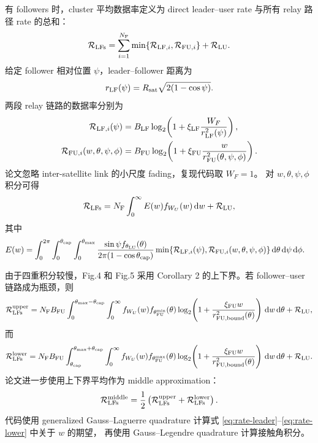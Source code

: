 \documentclass[UTF8,a4paper,11pt]{ctexart}
\newcommand{\Rsat}{R_{\rm sat}}
\newcommand{\thetac}{\theta_{\rm cap}}
\newcommand{\thetam}{\theta_{\max}}
\newcommand{\NF}{N_{\rm F}}
\newcommand{\dd}{\,{\rm d}}
\newcommand{\rFU}{r_{\rm FU}}
\newcommand{\rLF}{r_{\rm LF}}
\newcommand{\RLFs}{\mathcal{R}_{\rm LFs}}
\newcommand{\RLU}{\mathcal{R}_{\rm LU}}
\begin{document}
有 followers 时，cluster 平均数据率定义为 direct leader--user rate 与所有 relay
路径 rate 的总和：
\begin{equation}
    \RLFs=
    \sum_{i=1}^{\NF}\min\{\mathcal{R}_{{\rm LF},i},\mathcal{R}_{{\rm FU},i}\}+\RLU .
    \label{eq:rate-cluster-def}
\end{equation}
给定 follower 相对位置 $\psi$，leader--follower 距离为
\begin{equation}
    \rLF(\psi)=\Rsat\sqrt{2(1-\cos\psi)}.
\end{equation}
两段 relay 链路的数据率分别为
\begin{align}
    \mathcal{R}_{{\rm LF},i}(\psi)
    &=
    B_{\rm LF}\log_2\!\left(1+\xi_{\rm LF}\frac{W_F}{\rLF^2(\psi)}\right),\\
    \mathcal{R}_{{\rm FU},i}(w,\theta,\psi,\phi)
    &=
    B_{\rm FU}\log_2\!\left(1+\xi_{\rm FU}\frac{w}{\rFU^2(\theta,\psi,\phi)}\right).
\end{align}
论文忽略 inter-satellite link 的小尺度 fading，复现代码取 $W_F=1$。
对 $w,\theta,\psi,\phi$ 积分可得
\begin{equation}
    \RLFs = \NF\int_{0}^{\infty}E(w)f_{W_U}(w)\dd w+\RLU ,
\end{equation}
其中
\begin{equation}
\begin{aligned}
E(w)
&=\int_{0}^{2\pi}\int_{0}^{\thetac}\int_{0}^{\thetam}
\frac{\sin\psi f_{\theta_{\rm LU}}(\theta)}
{2\pi(1-\cos\thetac)}
\min\{\mathcal{R}_{{\rm LF},i}(\psi),\mathcal{R}_{{\rm FU},i}(w,\theta,\psi,\phi)\}
\dd\theta\dd\psi\dd\phi .
\end{aligned}
\end{equation}

由于四重积分较慢，Fig.4 和 Fig.5 采用 Corollary 2 的上下界。若 follower--user
链路成为瓶颈，则
\begin{equation}
    \RLFs^{\rm upper}
    =
    \NF B_{\rm FU}
    \int_{0}^{\thetam-\thetac}\int_{0}^{\infty}
    f_{W_U}(w)f_{\theta_{\rm FU}^{\min}}(\theta)
    \log_2\!\left(1+\frac{\xi_{\rm FU}w}{r_{\rm FU,bound}^2(\theta)}\right)
    \dd w\dd\theta+\RLU ,
    \label{eq:rate-upper}
\end{equation}
而
\begin{equation}
    \RLFs^{\rm lower}
    =
    \NF B_{\rm FU}
    \int_{\thetac}^{\thetam+\thetac}\int_{0}^{\infty}
    f_{W_U}(w)f_{\theta_{\rm FU}^{\max}}(\theta)
    \log_2\!\left(1+\frac{\xi_{\rm FU}w}{r_{\rm FU,bound}^2(\theta)}\right)
    \dd w\dd\theta+\RLU .
    \label{eq:rate-lower}
\end{equation}
论文进一步使用上下界平均作为 middle approximation：
\begin{equation}
    \RLFs^{\rm middle}
    =
    \frac{1}{2}\left(\RLFs^{\rm upper}+\RLFs^{\rm lower}\right).
    \label{eq:rate-middle}
\end{equation}
代码使用 generalized Gauss--Laguerre quadrature 计算式
\eqref{eq:rate-leader}--\eqref{eq:rate-lower} 中关于 $w$ 的期望，
再使用 Gauss--Legendre quadrature 计算接触角积分。
\end{document}
